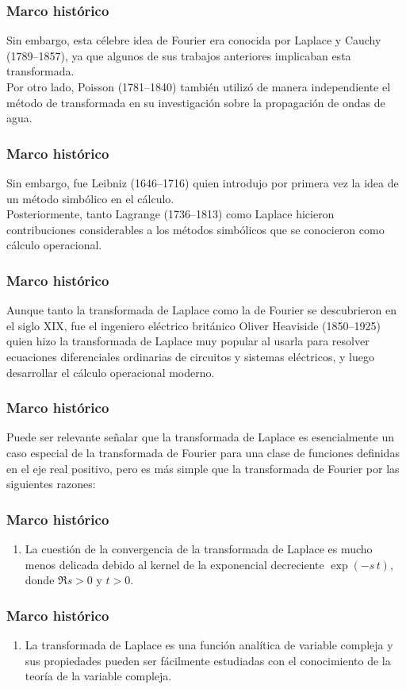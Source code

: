 \documentclass[12pt]{beamer}
\begin{document}
\begin{frame}
\frametitle{Marco histórico}
Sin embargo, esta célebre idea de Fourier era conocida por Laplace y Cauchy (1789–1857), ya que algunos de sus trabajos anteriores implicaban esta transformada.
\\
\bigskip
\pause
Por otro lado, Poisson (1781–1840) también utilizó de manera independiente el método de transformada en su investigación sobre la propagación de ondas de agua.
\end{frame}
\begin{frame}
\frametitle{Marco histórico}
Sin embargo, fue Leibniz (1646–1716) quien introdujo por primera vez la idea de un método simbólico en el cálculo.
\\
\bigskip
\pause
Posteriormente, tanto Lagrange (1736–1813) como Laplace hicieron contribuciones considerables a los métodos simbólicos que se conocieron como cálculo operacional.
\end{frame}
\begin{frame}
\frametitle{Marco histórico}
Aunque tanto la transformada de Laplace como la de Fourier se descubrieron en el siglo XIX, \pause fue el ingeniero eléctrico británico Oliver Heaviside (1850–1925) quien hizo la transformada de Laplace muy popular al usarla para resolver ecuaciones diferenciales ordinarias de circuitos y sistemas eléctricos, y luego desarrollar el cálculo operacional moderno.
\end{frame}
\begin{frame}
\frametitle{Marco histórico}
Puede ser relevante señalar que la transformada de Laplace es esencialmente un caso especial de la transformada de Fourier para una clase de funciones definidas en el eje real positivo, pero es más simple que la transformada de Fourier por las siguientes razones:
\end{frame}
\begin{frame}
\frametitle{Marco histórico}
\begin{enumerate}[<+->]
\item La cuestión de la convergencia de la transformada de Laplace es mucho menos delicada debido al kernel de la exponencial decreciente $\exp (-s \, t)$, donde $\Re{s} > 0$ y $t > 0$.
\seti
\end{enumerate}
\end{frame}
\begin{frame}
\frametitle{Marco histórico}
\begin{enumerate}[<+->]
\conti
\item La transformada de Laplace es una función analítica de variable compleja y sus propiedades pueden ser fácilmente estudiadas con el conocimiento de la teoría de la variable compleja.
\seti
\end{enumerate}
\end{frame}
\end{document}
